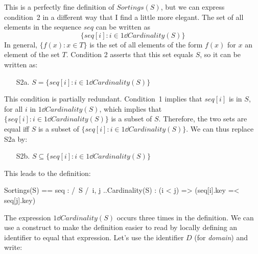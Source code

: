 \documentclass[fleqn,leqno]{article}
\begin{document}
This is a perfectly fine definition of $Sortings(S)$, but we can express
condition~2 in a different way that I find a little more elegant.  The
set of all elements in the sequence $seq$ can be written as
 \[ \{seq[i] : i \in 1\dd Cardinality(S)\}
 \]
In general, $\{f(x) : x \in T\}$ is the set of all elements of the form
$f(x)$ for $x$ an element of the set $T$.  Condition 2 asserts that this
set equals $S$, so it can be written as:
\begin{enumerate}
\item[S2a.] $S = \{seq[i] : i \in 1\dd Cardinality(S)\}$
\end{enumerate}
This condition is partially redundant.  Condition~1 implies that
$seq[i]$ is in $S$, for all $i$ in $1\dd Cardinality(S)$,  which
implies that $\{seq[i] : i \in 1\dd Cardinality(S)\}$ is a
subset of $S$.  Therefore, the two sets are equal iff
$S$ is a subset of $\{seq[i] : i \in 1\dd Cardinality(S)\}$.
We can thus replace S2a by:
\begin{enumerate}
\item[S2b.] $S\subseteq\{seq[i] : i \in 1\dd Cardinality(S)\}$
\end{enumerate}
This leads to the definition:
\begin{display}
\begin{notla}
Sortings(S) == 
   {seq \in [1..Cardinality(S) -> S] :
      /\ S 
      /\ \A i, j ..Cardinality(S) : (i < j) => (seq[i].key =< seq[j].key)}
\end{notla}
\begin{tlatex}
%
\end{tlatex}
\end{display}
The expression $1\dd Cardinality(S)$ occurs three times in the
definition.  We can use a 
construct to make the definition easier to read by locally defining an
identifier to equal that expression.  Let's use the identifier
$D$ (for \emph{domain}) and write:%
\end{document}
